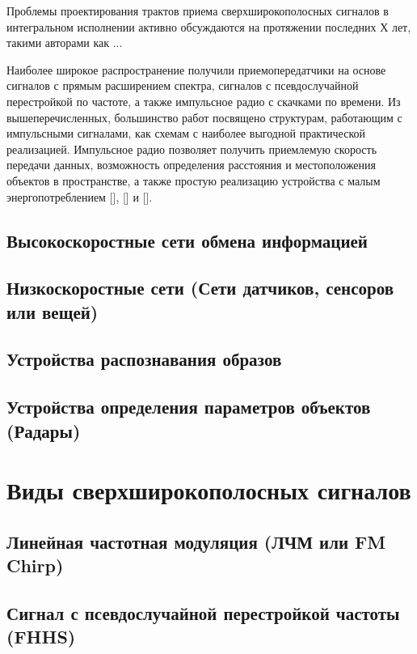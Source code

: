 Проблемы проектирования трактов приема сверхширокополосных сигналов в интегральном исполнении активно обсуждаются на протяжении последних Х лет, такими авторами как ...

Наиболее широкое распространение получили приемопередатчики на основе сигналов с прямым расширением спектра, сигналов с псевдослучайной перестройкой по частоте, а также импульсное радио с скачками по времени. Из вышеперечисленных, большинство работ посвящено структурам, работающим с импульсными сигналами, как схемам с наиболее выгодной практической реализацией. Импульсное радио позволяет получить приемлемую скорость передачи данных, возможность определения расстояния и  местоположения объектов в пространстве, а также простую реализацию устройства с малым энергопотреблением [], [] и [].

\subsection{Высокоскоростные сети обмена информацией}

\subsection{Низкоскоростные сети (Сети датчиков, сенсоров или вещей)}

\subsection{Устройства распознавания образов}

\subsection{Устройства определения параметров объектов (Радары)}

\section{Виды сверхширокополосных сигналов}

\subsection{Линейная частотная модуляция (ЛЧМ или FM Chirp)}

\subsection{Сигнал с псевдослучайной перестройкой частоты (FHHS)}

